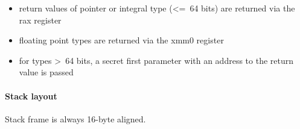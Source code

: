 \begin{itemize}
\item return values of pointer or integral type (\textless=\ 64 bits) are returned via the rax register
\item floating point types are returned via the xmm0 register
\item for types \textgreater\ 64 bits, a secret first parameter with an address to the return value is passed
\end{itemize}


\paragraph{Stack layout}

Stack frame is always 16-byte aligned.\\
\\
